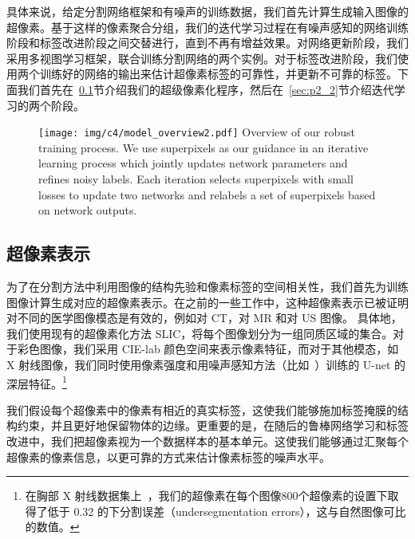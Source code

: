 具体来说，给定分割网络框架和有噪声的训练数据，我们首先计算生成输入图像的超像素。基于这样的像素聚合分组，我们的迭代学习过程在有噪声感知的网络训练阶段和标签改进阶段之间交替进行，直到不再有增益效果。对网络更新阶段，我们采用多视图学习框架，联合训练分割网络的两个实例。对于标签改进阶段，我们使用两个训练好的网络的输出来估计超像素标签的可靠性，并更新不可靠的标签。下面我们首先在~\ref{sec:p2_1}节介绍我们的超级像素化程序，然后在~\ref{sec:p2_2}节介绍迭代学习的两个阶段。

    \begin{figure}[tbp]
        \centering 
        \texttt{[image: img/c4/model\_overview2.pdf]}
        {Overview of our robust training process. We use superpixels as our guidance in an iterative learning process which jointly updates network parameters and refines noisy labels. Each iteration selects superpixels with small losses to update two networks and relabels a set of superpixels based on network outputs.} %
        \label{fig:nss_overview}
    \end{figure}


\subsection{超像素表示} \label{sec:p2_1}

为了在分割方法中利用图像的结构先验和像素标签的空间相关性，我们首先为训练图像计算生成对应的超像素表示。在之前的一些工作中，这种超像素表示已被证明对不同的医学图像模态是有效的，例如\citet{qin2018superpixel}对 CT，\citet{tian2015superpixel}对 MR 和\citet{daoud2019automatic}对 US 图像。
具体地，我们使用现有的超像素化方法 SLIC\citep{Achanta2012SLICSC}，将每个图像划分为一组同质区域的集合。对于彩色图像，我们采用 CIE-lab 颜色空间来表示像素特征，而对于其他模态，如 X 射线图像，我们同时使用像素强度和用噪声感知方法（比如~\citet{Wei2020CombatingNL}）训练的 U-net 的深层特征。\footnote{在胸部 X 射线数据集上~\cite{Shiraishi2000DevelopmentOA,Ginneken2006SegmentationOA}，我们的超像素在每个图像800个超像素的设置下取得了低于 0.32 的下分割误差（undersegmentation errors），这与自然图像可比的数值\citep{Achanta2012SLICSC}。}

我们假设每个超像素中的像素有相近的真实标签，这使我们能够施加标签掩膜的结构约束，并且更好地保留物体的边缘。更重要的是，在随后的鲁棒网络学习和标签改进中，我们把超像素视为一个数据样本的基本单元。这使我们能够通过汇聚每个超像素的像素信息，以更可靠的方式来估计像素标签的噪声水平。

